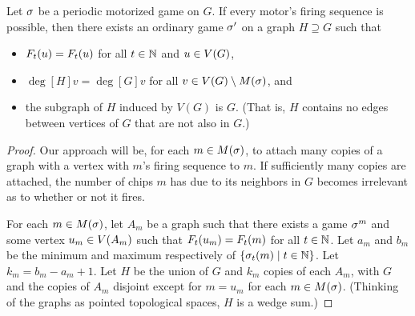 \begin{thm} \label{natMotors}
Let $\s$ be a periodic motorized game on $G$. If every motor's firing sequence
is possible, then there exists an ordinary game $\s'$ on a graph $H \supseteq
G$ such that
\begin{itemize}
\item $\firing[\s']{u}{t} = \firing{u}{t}$ for all $t \in \nats$ and $u \in
  \V$,
\item $\deg[H]{v} = \deg[G]{v}$ for all $v \in \V \setminus \mots$, and
\item the subgraph of $H$ induced by $V(G)$ is $G$. (That is, $H$ contains no
  edges between vertices of $G$ that are not also in $G$.)
\end{itemize}
\end{thm}

\begin{proof}
Our approach will be, for each $m \in \mots$, to attach many copies of a graph
with a vertex with $m$'s firing sequence to $m$. If sufficiently many copies
are attached, the number of chips $m$ has due to its neighbors in $G$ becomes
irrelevant as to whether or not it fires.

For each $m \in \mots$, let $A_m$ be a graph such that there exists a game
$\s^m$ and some vertex $u _m\in \V[A_m]$ such that $\firing[\s^m]{u_m}{t} =
\firing{m}{t}$ for all $t \in \nats$. Let $a_m$ and $b_m$ be the minimum and
maximum respectively of $\set{\chips{m}{t}}{t \in \nats}$. Let $k_m = b_m - a_m
+ 1$. Let $H$ be the union of $G$ and $k_m$ copies of each $A_m$, with $G$ and
the copies of $A_m$ disjoint except for $m = u_m$ for each $m \in
\mots$. (Thinking of the graphs as pointed topological spaces, $H$ is a wedge
sum.)


\end{proof}
